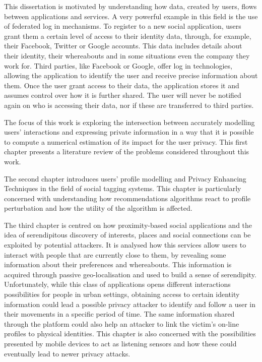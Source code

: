 This dissertation is motivated by understanding how data, created by users, flows between applications and services. A very powerful example in this field is the use of federated log in mechanisms. To register to a new social application, users grant them a certain level of access to their identity data, through, for example, their Facebook, Twitter or Google accounts. This data includes details about their identity, their whereabouts and in some situations even the company they work for. Third parties, like Facebook or Google, offer log in technologies, allowing the application to identify the user and receive precise information about them. Once the user grant access to their data, the application stores it and assumes control over how it is further shared. The user will never be notified again on who is accessing their data, nor if these are transferred to third parties. 

The focus of this work is exploring the intersection between accurately modelling users' interactions and expressing private information in a way that it is possible to compute a numerical estimation of its impact for the user privacy. This first chapter presents a literature review of the problems considered throughout this work.

The second chapter introduces users' profile modelling and Privacy Enhancing Techniques in the field of social tagging systems. This chapter is particularly concerned with understanding how recommendations algorithms react to profile perturbation and how the utility of the algorithm is affected.

The third chapter is centred on how proximity-based social applications and the idea of serendipitous discovery of interests, places and social connections can be exploited by potential attackers. It is analysed how this services allow users to interact with people that are currently close to them, by revealing some information about their preferences and whereabouts. This information is acquired through passive geo-localisation and used to build a sense of serendipity. Unfortunately, while this class of applications opens different interactions possibilities for people in urban settings, obtaining access to certain identity information could lead a possible privacy attacker to identify and follow a user in their movements in a specific period of time. The same information shared through the platform could also help an attacker to link the victim’s on-line profiles to physical identities. This chapter is also concerned with the possibilities presented by mobile devices to act as listening sensors and how these could eventually lead to newer privacy attacks.

